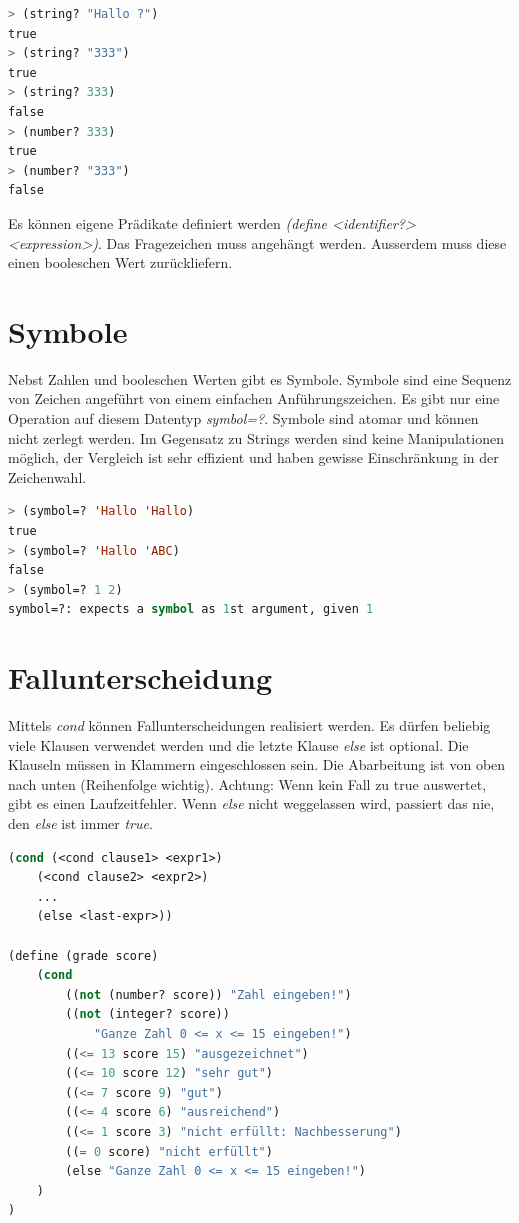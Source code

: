 \begin{lstlisting}[language=Lisp, caption=Prädikatsfunktionen]
> (string? "Hallo ?")
true
> (string? "333")
true
> (string? 333)
false
> (number? 333)
true
> (number? "333")
false
\end{lstlisting}

Es können eigene Prädikate definiert werden \emph{(define <identifier?> <expression>)}. Das Fragezeichen muss angehängt werden. Ausserdem muss diese einen booleschen Wert zurückliefern.

\section{Symbole}
Nebst Zahlen und booleschen Werten gibt es Symbole. Symbole sind eine Sequenz von Zeichen angeführt von einem einfachen Anführungszeichen. Es gibt nur eine Operation auf diesem Datentyp \emph{symbol=?}. Symbole sind atomar und können nicht zerlegt werden. Im Gegensatz zu Strings werden sind keine Manipulationen möglich, der Vergleich ist sehr effizient und haben gewisse Einschränkung in der Zeichenwahl.

\begin{lstlisting}[language=Lisp, caption=Symbole]
> (symbol=? 'Hallo 'Hallo)
true
> (symbol=? 'Hallo 'ABC)
false
> (symbol=? 1 2)
symbol=?: expects a symbol as 1st argument, given 1
\end{lstlisting}

\section{Fallunterscheidung}
Mittels \emph{cond} können Fallunterscheidungen realisiert werden. Es dürfen beliebig viele Klausen verwendet werden und die letzte Klause \emph{else} ist optional. Die Klauseln müssen in Klammern eingeschlossen sein. Die Abarbeitung ist von oben nach unten (Reihenfolge wichtig). Achtung: Wenn kein Fall zu true auswertet, gibt es einen Laufzeitfehler. Wenn \emph{else} nicht weggelassen wird, passiert das nie, den \emph{else} ist immer \emph{true}. 

\begin{lstlisting}[language=Lisp, caption=Fallunterscheidung]
(cond (<cond clause1> <expr1>)
	(<cond clause2> <expr2>)
	...
	(else <last-expr>))
	
(define (grade score)
	(cond
		((not (number? score)) "Zahl eingeben!")
		((not (integer? score))
			"Ganze Zahl 0 <= x <= 15 eingeben!")
		((<= 13 score 15) "ausgezeichnet")
		((<= 10 score 12) "sehr gut")
		((<= 7 score 9) "gut")
		((<= 4 score 6) "ausreichend")
		((<= 1 score 3) "nicht erfüllt: Nachbesserung")
		((= 0 score) "nicht erfüllt")
		(else "Ganze Zahl 0 <= x <= 15 eingeben!")
	)
)
\end{lstlisting}

